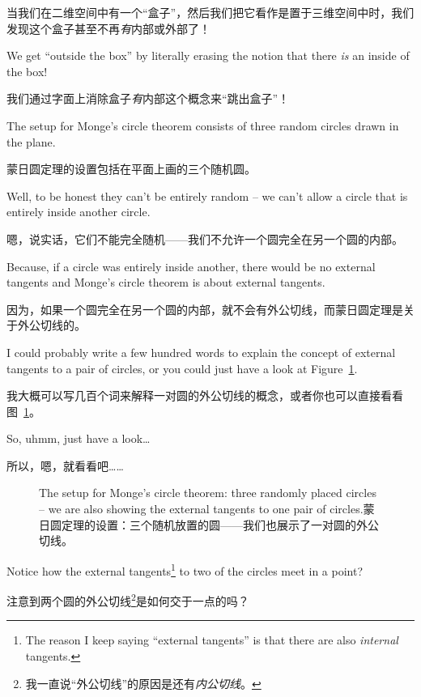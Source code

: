 当我们在二维空间中有一个“盒子”，然后我们把它看作是置于三维空间中时，我们发现这个盒子甚至不再\emph{有}内部或外部了！

We get ``outside 
the box'' by literally erasing the notion that there \emph{is} an inside
of the box!

我们通过字面上消除盒子\emph{有}内部这个概念来“跳出盒子”！

The setup for Monge's circle theorem consists of three random circles
drawn in the plane.

蒙日圆定理的设置包括在平面上画的三个随机圆。

Well, to be honest they can't be entirely random --
we can't allow a circle that is entirely inside another circle.

嗯，说实话，它们不能完全随机——我们不允许一个圆完全在另一个圆的内部。

Because,
if a circle was entirely inside another, there would be no external tangents
and Monge's circle theorem is about external tangents.

因为，如果一个圆完全在另一个圆的内部，就不会有外公切线，而蒙日圆定理是关于外公切线的。

I could probably write a few hundred words to explain the concept of 
external tangents to a pair of circles, or you could just have a look at
Figure~\ref{fig:monge1}.

我大概可以写几百个词来解释一对圆的外公切线的概念，或者你也可以直接看看图~\ref{fig:monge1}。

So, uhmm, just have a look\ldots

所以，嗯，就看看吧……

\begin{figure}[!hbtp] 
\begin{center}

\end{center}
\caption[Setup for Monge's circle theorem.蒙日圆定理的设置。]{The setup for Monge's circle theorem: three randomly placed circles -- we are also showing the external tangents to
one pair of circles.蒙日圆定理的设置：三个随机放置的圆——我们也展示了一对圆的外公切线。}
\label{fig:monge1}
\end{figure}
 
Notice how the external tangents\footnote{The reason I keep saying ``external tangents'' is that there are also \emph{internal} tangents.} to two of the circles meet in a point?

注意到两个圆的外公切线\footnote{我一直说“外公切线”的原因是还有\emph{内公切线}。}是如何交于一点的吗？

